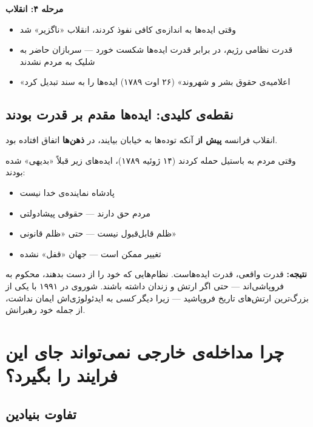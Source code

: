 \begin{tcolorbox}[casebox, title={فرایند تبدیل ایده به تغییر سیاسی}]
\tcblower

\textbf{مرحله ۴: انقلاب }
\begin{itemize}
\item وقتی ایده‌ها به اندازه‌ی کافی نفوذ کردند، انقلاب «ناگزیر» شد
\item قدرت نظامی رژیم، در برابر قدرت ایده‌ها شکست خورد — سربازان حاضر
  به شلیک به مردم نشدند
\item «اعلامیه‌ی حقوق بشر و شهروند» (۲۶ اوت ۱۷۸۹) ایده‌ها را به
  سند تبدیل کرد
\end{itemize}
\end{tcolorbox}


\subsection{نقطه‌ی کلیدی: ایده‌ها مقدم بر قدرت بودند}

\begin{tcolorbox}[defbox, title={درس بنیادین}]
انقلاب فرانسه \textbf{پیش از} آنکه توده‌ها به خیابان بیایند، در
\textbf{ذهن‌ها} اتفاق افتاده بود.

وقتی مردم به باستیل حمله کردند (۱۴ ژوئیه ۱۷۸۹)، ایده‌های زیر قبلاً
«بدیهی» شده بودند:
\begin{itemize}
\item پادشاه نماینده‌ی خدا نیست
\item مردم حق دارند — حقوقی پیشادولتی
\item ظلم قابل‌قبول نیست — حتی «ظلم قانونی»
\item تغییر ممکن است — جهان «قفل» نشده
\end{itemize}

\textbf{نتیجه:} قدرت واقعی، قدرت ایده‌هاست. نظام‌هایی که
 خود را از دست بدهند، محکوم به فروپاشی‌اند — حتی
اگر ارتش و زندان داشته باشند. شوروی در ۱۹۹۱ با یکی از بزرگ‌ترین
ارتش‌های تاریخ فروپاشید — زیرا دیگر \textit{کسی} به ایدئولوژی‌اش
ایمان نداشت، از جمله خود رهبرانش.
\end{tcolorbox}


\section{چرا مداخله‌ی خارجی نمی‌تواند جای این فرایند را بگیرد؟}
\label{sec:ch16-intervention-vs-ideas}

\subsection{تفاوت بنیادین}

